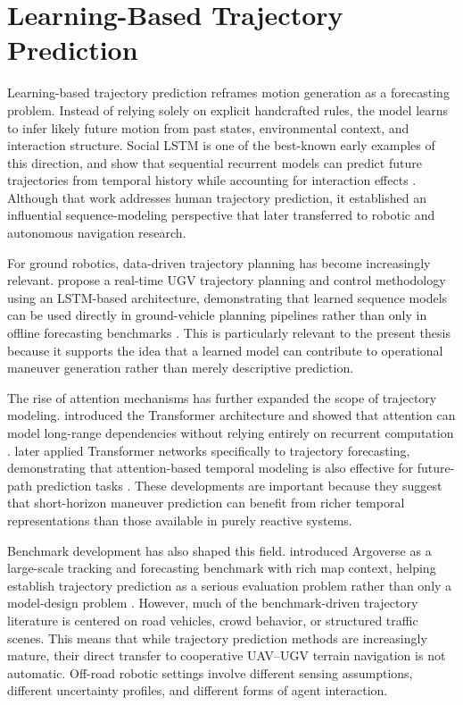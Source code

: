 \section{Learning-Based Trajectory Prediction}

Learning-based trajectory prediction reframes motion generation as a forecasting problem. Instead of relying solely on explicit handcrafted rules, the model learns to infer likely future motion from past states, environmental context, and interaction structure. Social LSTM is one of the best-known early examples of this direction, and \citeauthor{alahi2016sociallstm} show that sequential recurrent models can predict future trajectories from temporal history while accounting for interaction effects \citep{alahi2016sociallstm}. Although that work addresses human trajectory prediction, it established an influential sequence-modeling perspective that later transferred to robotic and autonomous navigation research.

For ground robotics, data-driven trajectory planning has become increasingly relevant. \citeauthor{chen2024data} propose a real-time UGV trajectory planning and control methodology using an LSTM-based architecture, demonstrating that learned sequence models can be used directly in ground-vehicle planning pipelines rather than only in offline forecasting benchmarks \citep{chen2024data}. This is particularly relevant to the present thesis because it supports the idea that a learned model can contribute to operational maneuver generation rather than merely descriptive prediction.

The rise of attention mechanisms has further expanded the scope of trajectory modeling. \citeauthor{vaswani2023attention} introduced the Transformer architecture and showed that attention can model long-range dependencies without relying entirely on recurrent computation \citep{vaswani2023attention}. \citeauthor{giuliari2020transformer} later applied Transformer networks specifically to trajectory forecasting, demonstrating that attention-based temporal modeling is also effective for future-path prediction tasks \citep{giuliari2020transformer}. These developments are important because they suggest that short-horizon maneuver prediction can benefit from richer temporal representations than those available in purely reactive systems.

Benchmark development has also shaped this field. \citeauthor{chang2019argoverse} introduced Argoverse as a large-scale tracking and forecasting benchmark with rich map context, helping establish trajectory prediction as a serious evaluation problem rather than only a model-design problem \citep{chang2019argoverse}. However, much of the benchmark-driven trajectory literature is centered on road vehicles, crowd behavior, or structured traffic scenes. This means that while trajectory prediction methods are increasingly mature, their direct transfer to cooperative UAV--UGV terrain navigation is not automatic. Off-road robotic settings involve different sensing assumptions, different uncertainty profiles, and different forms of agent interaction.


